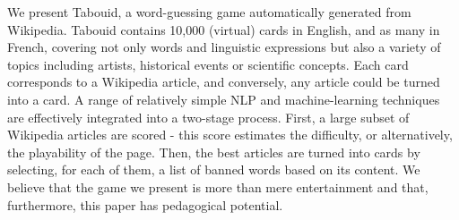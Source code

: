 We present Tabouid, a word-guessing game automatically generated from Wikipedia. Tabouid contains 10,000 (virtual) cards in English, and as many in French, covering not only words and linguistic expressions but also a variety of topics including artists, historical events or scientific concepts. Each card corresponds to a Wikipedia article, and conversely, any article could be turned into a card. A range of relatively simple NLP and machine-learning techniques are effectively integrated into a two-stage process. First, a large subset of Wikipedia articles are scored - this score estimates the difficulty, or alternatively, the playability of the page. Then, the best articles are turned into cards by selecting, for each of them, a list of banned words based on its content. We believe that the game we present is more than mere entertainment and that, furthermore, this paper has pedagogical potential.
